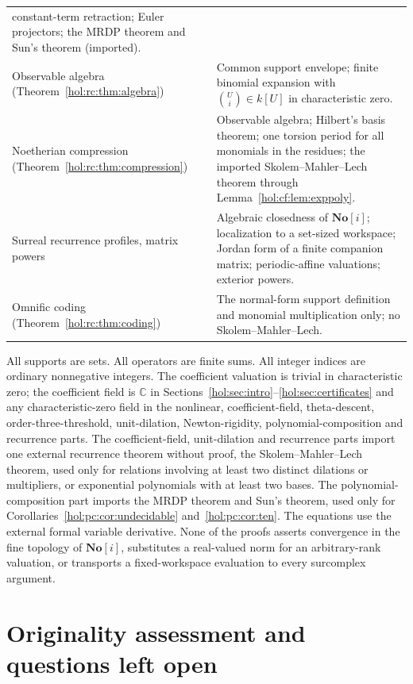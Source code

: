 \documentclass[11pt]{article}
\numberwithin{equation}{section}
\theoremstyle{definition}
\theoremstyle{remark}
\newcommand{\C}{\mathbb C}
\newcommand{\No}{\mathbf{No}}
\begin{document}
\begin{longtable}{@{}>{\raggedright\arraybackslash}p{}
                    >{\raggedright\arraybackslash}p{}@{}}
constant-term retraction; Euler projectors; the MRDP theorem and Sun's theorem
(imported).\\
Observable algebra (Theorem~\ref{hol:rc:thm:algebra}) & Common support
envelope; finite binomial expansion with $\binom Ui\in k[U]$ in characteristic
zero.\\
Noetherian compression (Theorem~\ref{hol:rc:thm:compression}) & Observable
algebra; Hilbert's basis theorem; one torsion period for all monomials in the
residues; the imported Skolem--Mahler--Lech theorem through
Lemma~\ref{hol:cf:lem:exppoly}.\\
Surreal recurrence profiles, matrix powers & Algebraic closedness of $\No[i]$;
localization to a set-sized workspace; Jordan form of a finite companion
matrix; periodic-affine valuations; exterior powers.\\
Omnific coding (Theorem~\ref{hol:rc:thm:coding}) & The normal-form support
definition and monomial multiplication only; no Skolem--Mahler--Lech.\\
\bottomrule
\end{longtable}

All supports are sets. All operators are finite sums. All integer indices are
ordinary nonnegative integers. The coefficient valuation is trivial in
characteristic zero; the coefficient field is $\C$ in
Sections~\ref{hol:sec:intro}--\ref{hol:sec:certificates} and any
characteristic-zero field in the nonlinear, coefficient-field, theta-descent,
order-three-threshold, unit-dilation, Newton-rigidity,
polynomial-composition and recurrence parts. The
coefficient-field, unit-dilation and recurrence parts import one external
recurrence theorem without proof, the Skolem--Mahler--Lech theorem, used only
for relations involving at least two distinct dilations or multipliers, or
exponential polynomials with at least two bases. The
polynomial-composition part imports the MRDP theorem and Sun's theorem, used
only for Corollaries~\ref{hol:pc:cor:undecidable} and~\ref{hol:pc:cor:ten}.
The equations use the
external formal variable derivative. None of the proofs asserts convergence in the fine topology of
$\No[i]$, substitutes a real-valued norm for an arbitrary-rank valuation, or
transports a fixed-workspace evaluation to every surcomplex argument.

\section{Originality assessment and questions left open}
\label{hol:sec:status}
\end{document}
